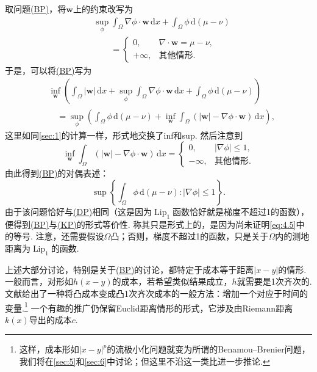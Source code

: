 取问题\hyperref[obj:4.5]{(BP)}，将$\mathbf w$上的约束改写为
\begin{equation*}
\begin{aligned}
 &\sup_\phi\int_\Omega\nabla\phi\cdot\mathbf w\,\mathrm dx
                  +\int_\Omega\phi\,\mathrm d(\mu-\nu)\\
 &\qquad=\begin{cases}
 0,&\nabla\cdot\mathbf w=\mu-\nu,\\
 +\infty,&\text{其他情形}.
 \end{cases}
\end{aligned}
\end{equation*}
于是，可以将\hyperref[obj:4.5]{(BP)}写为
\begin{equation}\label{eq:4.5}
\begin{aligned}
 &\inf_{\mathbf w}\left(\int_\Omega|\mathbf w|\,\mathrm dx
      +\sup_\phi\int_\Omega\nabla\phi\cdot\mathbf w\,\mathrm dx
      +\int_\Omega\phi\,\mathrm d(\mu-\nu)\right)\\
 &\quad=\sup_\phi\left(\int_\Omega\phi\,\mathrm d(\mu-\nu)
       +\inf_{\mathbf w}\int_\Omega
                (|\mathbf w|-\nabla\phi\cdot\mathbf w)\,\mathrm dx\right),
\end{aligned}
\end{equation}
这里如同\autoref{sec:1}的计算一样，形式地交换了inf和sup. 然后注意到
\[
 \inf_{\mathbf w}\int_\Omega(|\mathbf w|-\nabla\phi\cdot\mathbf w)\,\mathrm dx
 =\begin{cases}
 0,&|\nabla\phi|\leq1,\\
 -\infty,&\text{其他情形}.
 \end{cases}
\]
由此得到\hyperref[obj:4.5]{(BP)}的对偶表述：
\[
 \sup\left\{\int_\Omega\phi\,\mathrm d(\mu-\nu):|\nabla\phi|\leq1\right\}.
\]
由于该问题恰好与\hyperref[obj:1.9]{(DP)}相同（这是因为$\operatorname{Lip}_1$函数恰好就是梯度不超过1的函数），便得到\hyperref[obj:4.5]{(BP)}与\hyperref[obj:1.2]{(KP)}的形式等价性. 称其只是形式上的，是因为尚未证明\eqref{eq:4.5}中的等号. 注意，还需要假设$\Omega$凸；否则，梯度不超过1的函数，只是关于$\Omega$内的测地距离为$\operatorname{Lip}_1$的函数.

上述大部分讨论，特别是关于\hyperref[obj:4.5]{(BP)}的讨论，都特定于成本等于距离$|x-y|$的情形. 一般而言，对形如$h(x-y)$的成本，若希望类似结果成立，$h$就需要是1次齐次的. 文献\cite{b195,b196}给出了一种将凸成本变成凸1次齐次成本的一般方法：增加一个对应于时间的变量.\footnote{\label{idx:root4-p128-benamou-brenier}这样，成本形如$|x-y|^p$的流极小化问题就变为所谓的Benamou--Brenier问题，我们将在\autoref{sec:5}和\autoref{sec:6}中讨论；但这里不沿这一类比进一步推论.} 一个有趣的推广仍保留Euclid距离情形的形式，它涉及由Riemann距离$k(x)$导出的成本$c$.

